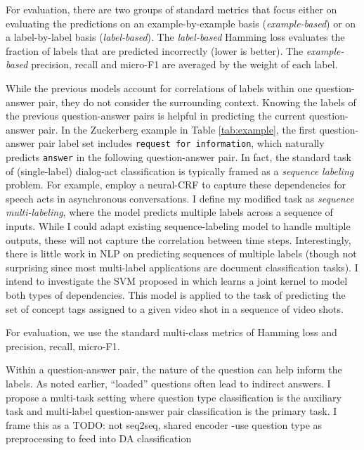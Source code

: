 For evaluation, there are two groups of standard metrics that focus either on evaluating the predictions on an example-by-example basis (\emph{example-based}) or on a label-by-label basis (\emph{label-based}). The \emph{label-based} Hamming loss evaluates the fraction of labels that are predicted incorrectly (lower is better). The \emph{example-based} precision, recall and micro-F1 are averaged by the weight of each label. 

 While the previous models account for correlations of labels within one question-answer pair, they do not consider the surrounding context. Knowing the labels of the previous question-answer pairs is helpful in predicting the current question-answer pair. In the Zuckerberg example in Table \ref{tab:example}, the first question-answer pair label set includes \texttt{request for information}, which naturally predicts \texttt{answer} in the following question-answer pair. In fact, the standard task of (single-label) dialog-act classification is typically framed as a \emph{sequence labeling} problem. For example, \citet{Joty:2018} employ a neural-CRF to capture these dependencies for speech acts in asynchronous conversations. I define my modified task as \emph{sequence multi-labeling}, where the model predicts multiple labels across a sequence of inputs. While I could adapt existing sequence-labeling model to handle multiple outputs, these will not capture the correlation between time steps. Interestingly, there is little work in NLP on predicting sequences of multiple labels (though not surprising since most multi-label applications are document classification tasks). I intend to investigate the SVM proposed in \citet{Li:2010} which learns a joint kernel to model both types of dependencies. This model is applied to the task of predicting the set of concept tags assigned to a given video shot in a sequence of video shots. 

For evaluation, we use the standard multi-class metrics of Hamming loss and precision, recall, micro-F1.

 Within a question-answer pair, the nature of the question can help inform the labels. As noted earlier, ``loaded'' questions often lead to indirect answers. I propose a multi-task setting where question type classification is the auxiliary task and multi-label question-answer pair classification is the primary task. I frame this as a 
TODO: not seq2seq, shared encoder
-use question type as preprocessing to feed into DA classification

